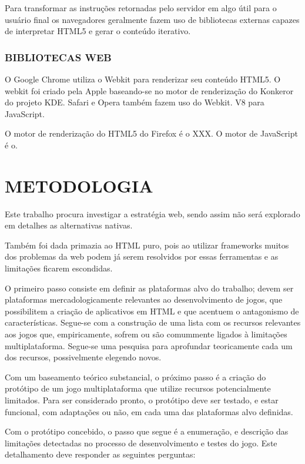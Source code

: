 \documentclass[11pt,a4paper]{article}
\begin{document}
Para transformar as instruções retornadas pelo servidor em algo útil para o usuário final os navegadores geralmente fazem uso de bibliotecas externas capazes de interpretar HTML5 e gerar o conteúdo iterativo.

\subsection{BIBLIOTECAS WEB}

O Google Chrome utiliza o Webkit para renderizar seu conteúdo HTML5. O webkit foi criado pela Apple baseando-se no motor de renderização do Konkeror do projeto KDE. Safari e Opera também fazem uso do Webkit. V8 para JavaScript.

O motor de renderização do HTML5 do Firefox é o XXX. O motor de JavaScript é o.


\chapter{METODOLOGIA}

Este trabalho procura investigar a estratégia web, sendo assim não será explorado em detalhes as alternativas nativas.

Também foi dada primazia ao HTML puro, pois ao utilizar frameworks muitos dos problemas da web podem já serem resolvidos por essas ferramentas e as limitações ficarem escondidas.


O primeiro passo consiste em definir as plataformas alvo do trabalho; devem ser plataformas mercadologicamente relevantes ao desenvolvimento de jogos, que possibilitem a criação de aplicativos em HTML e que acentuem o antagonismo de características.
Segue-se com a construção de uma lista com os recursos relevantes aos jogos que, empiricamente, sofrem ou são comummente ligados à limitações multiplataforma. Segue-se uma pesquisa para aprofundar teoricamente cada um dos recursos, possivelmente elegendo novos.

Com um baseamento teórico substancial, o próximo passo é a criação do protótipo de um jogo multiplataforma que utilize recursos potencialmente limitados. Para ser considerado pronto, o protótipo deve ser testado, e estar funcional, com adaptações ou não, em cada uma das plataformas alvo definidas.

Com o protótipo concebido, o passo que segue é a enumeração, e descrição das limitações detectadas no processo de desenvolvimento e testes do jogo. Este detalhamento deve responder as seguintes perguntas:
\end{document}
